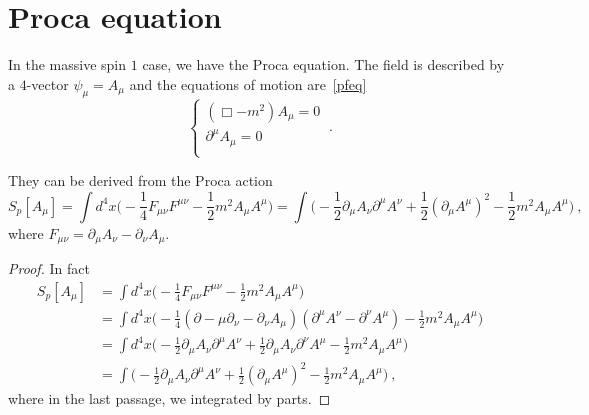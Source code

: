\chapter{Proca equation}

    In the massive spin $1$ case, we have the Proca equation. The field is described by a $4$-vector $\psi_\mu = A_\mu$ and the equations of motion are~\eqref{pfeq}
    \begin{equation}\label{proca}
        \begin{cases}
            (\Box - m^2) A_\mu = 0 \\
            \partial^\mu A_\mu = 0 \\
        \end{cases} ~.
    \end{equation}

    They can be derived from the Proca action 
    \begin{equation*}
        S_p [A_\mu] = \int d^4 x \Big ( - \frac{1}{4} F_{\mu\nu} F^{\mu\nu} - \frac{1}{2} m^2 A_\mu A^\mu \Big) = \int \Big ( -\frac{1}{2} \partial_\mu A_\nu \partial^\mu A^\nu + \frac{1}{2} (\partial_\mu A^\mu)^2 - \frac{1}{2} m^2 A_\mu A^\mu \Big) ~,
    \end{equation*}
    where $F_{\mu\nu} = \partial_\mu A_\nu - \partial_\nu A_\mu$.
    \begin{proof}
        In fact 
        \begin{equation*}
        \begin{aligned}
            S_p [A_\mu] & = \int d^4 x \Big ( - \frac{1}{4} F_{\mu\nu} F^{\mu\nu} - \frac{1}{2} m^2 A_\mu A^\mu \Big) \\ & = \int d^4 x \Big ( - \frac{1}{4} (\partial-\mu \partial_\nu - \partial_\nu A_\mu)(\partial^\mu A^\nu - \partial^\nu A^\mu) - \frac{1}{2} m^2 A_\mu A^\mu \Big) \\ & = \int d^4 x \Big ( - \frac{1}{2} \partial_\mu A_\nu \partial^\mu A^\nu + \frac{1}{2} \partial_\mu A_\nu \partial^\nu A^\mu - \frac{1}{2} m^2 A_\mu A^\mu \Big ) \\ & = \int \Big ( -\frac{1}{2} \partial_\mu A_\nu \partial^\mu A^\nu + \frac{1}{2} (\partial_\mu A^\mu)^2 - \frac{1}{2} m^2 A_\mu A^\mu \Big) ~,
        \end{aligned}
        \end{equation*}
        where in the last passage, we integrated by parts.
    \end{proof}  

